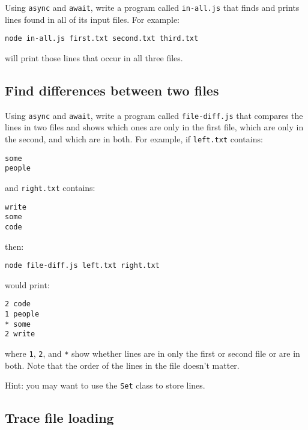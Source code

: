 \documentclass[krantzl]{krantz}
\begin{document}
Using \texttt{async} and \texttt{await},
write a program called \texttt{in-all.js} that finds and prints lines found in all of its input files.
For example:

\begin{lstlisting}[frame=single,frameround=tttt]
node in-all.js first.txt second.txt third.txt
\end{lstlisting}


\noindent will print those lines that occur in all three files.

\subsection*{Find differences between two files}


Using \texttt{async} and \texttt{await},
write a program called \texttt{file-diff.js}
that compares the lines in two files
and shows which ones are only in the first file,
which are only in the second,
and which are in both.
For example,
if \texttt{left.txt} contains:

\begin{lstlisting}[frame=single,frameround=tttt]
some
people
\end{lstlisting}


\noindent and \texttt{right.txt} contains:

\begin{lstlisting}[frame=single,frameround=tttt]
write
some
code
\end{lstlisting}


\noindent then:

\begin{lstlisting}[frame=single,frameround=tttt]
node file-diff.js left.txt right.txt
\end{lstlisting}


\noindent would print:

\begin{lstlisting}[frame=single,frameround=tttt]
2 code
1 people
* some
2 write
\end{lstlisting}


\noindent where \texttt{1}, \texttt{2}, and \texttt{*} show whether lines are in only the first or second file
or are in both.
Note that the order of the lines in the file doesn't matter.


Hint: you may want to use the \texttt{Set} class to store lines.

\subsection*{Trace file loading}
\end{document}

